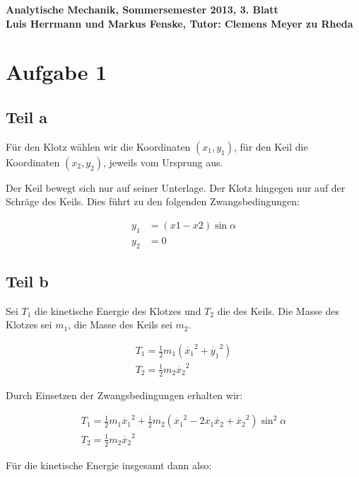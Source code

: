 \documentclass[a4paper,german,12pt,smallheadings]{scrartcl}
\begin{document}
\begin{center}
\bfseries %
\sffamily %
\vspace{-40pt}
Analytische Mechanik, Sommersemester 2013, 3. Blatt \\
Luis Herrmann und Markus Fenske, Tutor: Clemens Meyer zu Rheda
\vspace{-10pt}
\end{center}
\section*{Aufgabe 1}

\subsection*{Teil a}
Für den Klotz wählen wir die Koordinaten $(x_1, y_1)$, für den Keil die
Koordinaten $(x_2, y_2)$, jeweils vom Ursprung aus.

Der Keil bewegt sich nur auf seiner Unterlage. Der Klotz hingegen nur auf der
Schräge des Keils. Dies führt zu den folgenden Zwangsbedingungen:


\begin{align*}
  y_1 &= (x1-x2) \sin \alpha \\
  y_2 &= 0
\end{align*}

\subsection*{Teil b}

Sei $T_1$ die kinetische Energie des Klotzes und $T_2$ die des Keils. Die Masse
des Klotzes sei $m_1$, die Masse des Keils sei $m_2$.

\begin{align*}
  T_1 = \frac{1}{2} m_1 \left(\dot{x_1}^2 + \dot{y_1}^2\right) \\
  T_2 = \frac{1}{2} m_2 \dot{x_2}^2
\end{align*}

Durch Einsetzen der Zwangsbedingungen erhalten wir:

\begin{align*}
  T_1 = \frac{1}{2}m_1\dot{x_1}^2 + \frac{1}{2}m_2 (\dot{x_1}^2 - 2\dot{x_1}\dot{x_2}+\dot{x_2}^2) \sin^2 \alpha \\
  T_2 = \frac{1}{2} m_2 \dot{x_2}^2
\end{align*}

Für die kinetische Energie insgesamt dann also:
\end{document}
